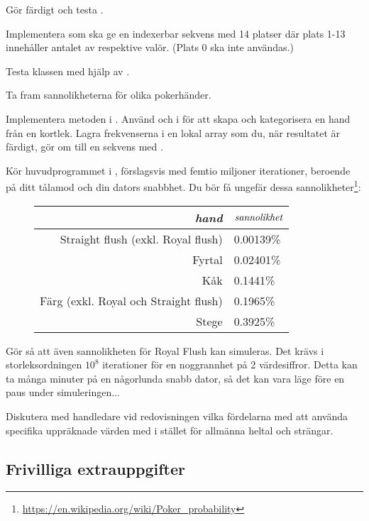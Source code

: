 \Task Gör färdigt och testa .

\Subtask Implementera  som ska ge en indexerbar sekvens med 14 platser där plats 1-13 innehåller antalet av respektive valör. (Plats 0 ska inte användas.)

\Subtask Testa klassen  med hjälp av .

\Task Ta fram sannolikheterna för olika pokerhänder.

\Subtask Implementera metoden  i . Använd  och  i  för att skapa och kategorisera en hand från en kortlek. Lagra frekvenserna i en lokal array som du, när resultatet är färdigt, gör om till en sekvens med .

\Subtask Kör huvudprogrammet i , förslagsvis med femtio miljoner iterationer, beroende på ditt tålamod och din dators snabbhet. Du bör få ungefär dessa sannolikheter\footnote{\url{https://en.wikipedia.org/wiki/Poker_probability}}:
\begin{figure}[H]\centering
\begin{tabular}{r|l}
\emph{hand} & $\emph{sannolikhet}$ \\ \hline
Straight flush (exkl. Royal flush) & 0.00139\%  \\
Fyrtal         & 0.02401\%    \\
Kåk            & 0.1441\%    \\
Färg (exkl. Royal och Straight flush)         & 0.1965\%    \\
Stege       & 0.3925\%     \\
\end{tabular}
\end{figure}

\Task Gör så att även sannolikheten för Royal Flush kan simuleras. Det krävs i storleksordningen $10^8$ iterationer för en noggrannhet på 2 värdesiffror. Detta kan ta många minuter på en någorlunda snabb dator, så det kan vara läge före en paus under simuleringen...

\Task Diskutera med handledare vid redovisningen vilka fördelarna med att använda specifika uppräknade värden med  i stället för allmänna heltal och strängar.

\subsection{Frivilliga extrauppgifter}

